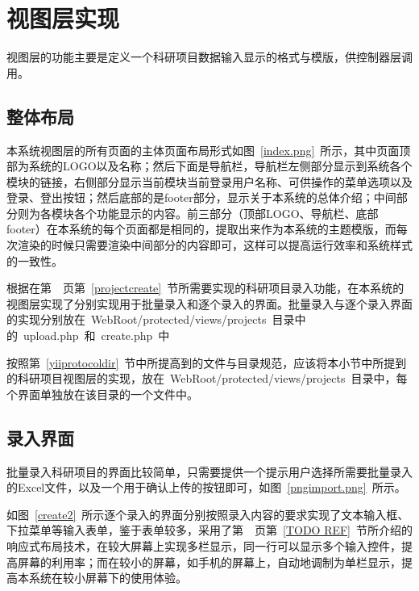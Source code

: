 \section{视图层实现}
视图层的功能主要是定义一个科研项目数据输入显示的格式与模版，供控制器层调用。
\subsection{整体布局}

本系统视图层的所有页面的主体页面布局形式如图~\ref{index.png}~所示，其中页面顶部为系统的LOGO以及名称；然后下面是导航栏，导航栏左侧部分显示到系统各个模块的链接，右侧部分显示当前模块当前登录用户名称、可供操作的菜单选项以及登录、登出按钮；然后底部的是footer部分，显示关于本系统的总体介绍；中间部分则为各模块各个功能显示的内容。前三部分（顶部LOGO、导航栏、底部footer）在本系统的每个页面都是相同的，提取出来作为本系统的主题模版，而每次渲染的时候只需要渲染中间部分的内容即可，这样可以提高运行效率和系统样式的一致性。

根据在第~\pageref{projectcreate}~页第~\ref{projectcreate}~节所需要实现的科研项目录入功能，在本系统的视图层实现了分别实现用于批量录入和逐个录入的界面。批量录入与逐个录入界面的实现分别放在~WebRoot/protected/views/projects~目录中的~upload.php~和~create.php~中


按照第~\ref{yiiprotocoldir}~节中所提高到的文件与目录规范，应该将本小节中所提到的科研项目视图层的实现，放在~WebRoot/protected/views/projects~目录中，每个界面单独放在该目录的一个文件中。

\subsection{录入界面}
\label{projectcreateview}

批量录入科研项目的界面比较简单，只需要提供一个提示用户选择所需要批量录入的Excel文件，以及一个用于确认上传的按钮即可，如图~\ref{pngimport.png}~所示。


如图~\ref{create2}~所示逐个录入的界面分别按照录入内容的要求实现了文本输入框、下拉菜单等输入表单，鉴于表单较多，采用了第~\pageref{TODO REF}~页第~\ref{TODO REF}~节所介绍的响应式布局技术，在较大屏幕上实现多栏显示，同一行可以显示多个输入控件，提高屏幕的利用率；而在较小的屏幕，如手机的屏幕上，自动地调制为单栏显示，提高本系统在较小屏幕下的使用体验。

